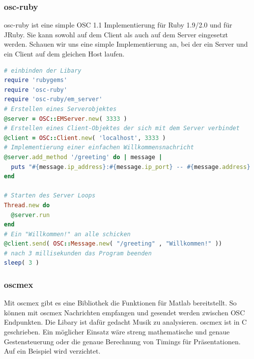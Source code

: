 \documentclass[a4paper, 12pt]{article}
\begin{document}
\subsubsection{osc-ruby}
osc-ruby ist eine simple OSC 1.1 Implementierung für Ruby 1.9/2.0 und für JRuby.
Sie kann sowohl auf dem Client als auch auf dem Server eingesetzt werden.
Schauen wir uns eine simple Implementierung an, bei der ein Server und ein Client auf dem gleichen Host laufen.\cite{oscruby}
\newpage
\begin{lstlisting}[language=ruby]
# einbinden der Libary
require 'rubygems'
require 'osc-ruby'
require 'osc-ruby/em_server'
# Erstellen eines Serverobjektes
@server = OSC::EMServer.new( 3333 )
# Erstellen eines Client-Objektes der sich mit dem Server verbindet
@client = OSC::Client.new( 'localhost', 3333 )
# Implementierung einer einfachen Willkommensnachricht
@server.add_method '/greeting' do | message |
  puts "#{message.ip_address}:#{message.ip_port} -- #{message.address} -- #{message.to_a}"
end

# Starten des Server Loops
Thread.new do
  @server.run
end
# Ein "Willkommen!" an alle schicken
@client.send( OSC::Message.new( "/greeting" , "Willkommen!" ))
# nach 3 millisekunden das Program beenden
sleep( 3 )
\end{lstlisting}

\subsubsection{oscmex}
Mit oscmex gibt es eine Bibliothek die Funktionen für Matlab bereitstellt.
So können mit oscmex Nachrichten empfangen und gesendet werden zwischen OSC Endpunkten.
Die Libary ist dafür gedacht Musik zu analysieren. oscmex ist in C geschrieben.
Ein möglicher Einsatz wäre streng mathematische und genaue Gestensteuerung oder die genaue Berechnung von Timings für Präsentationen. Auf ein Beispiel wird verzichtet.\cite{oscmex}
\end{document}
